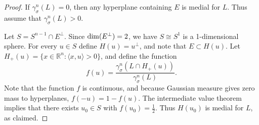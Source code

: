 \documentclass[12pt,oneside,reqno]{amsart}
\numberwithin{equation}{section}
\theoremstyle{remark}
\newcommand{\R}{\mathbb R}
\newcommand{\ip}[2]{\langle #1,#2\rangle}
\begin{document}
\begin{proof}
If $\gamma_\sigma^n(L)=0$, then any hyperplane containing $E$ is medial for $L$. Thus assume that $\gamma_\sigma^n(L)>0$.

Let $S=S^{n-1}\cap E^\perp$. Since ${\rm dim}(E^\perp)=2$, we have $S\cong S^1$ is a 1-dimensional sphere. For every $u\in S$ define $H(u) =u^\perp$, and note that $E\subset H(u)$. Let $H_+(u)=\{x\in \R^n:\ip{x}{u}>0\}$, and define the function
\[
        f(u)=\frac{\gamma_\sigma^n(L\cap H_+(u))}{\gamma_\sigma^n(L)}.
\]
Note that the function $f$ is continuous, and because Gaussian measure gives zero mass to hyperplanes, $f(-u)=1-f(u)$. The intermediate value theorem implies that there exists $u_0\in S$ with $f(u_0)=\frac{1}{2}$. Thus $H(u_0)$ is medial for $L$, as claimed.
\end{proof}

\end{document}
